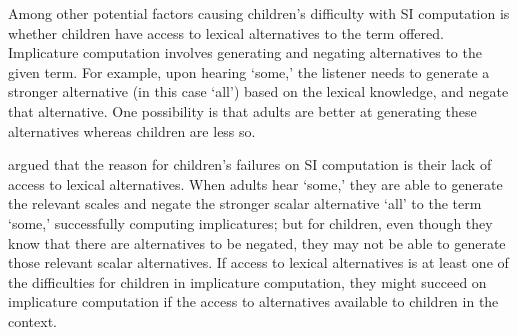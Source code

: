 \documentclass[10pt,letterpaper]{article}
\begin{document}
Among other potential factors causing children's difficulty with SI computation is whether children have access to lexical alternatives to the term offered. Implicature computation involves generating and negating alternatives to the given term. For example, upon hearing `some,' the listener needs to generate a stronger alternative (in this case `all') based on the lexical knowledge, and negate that alternative. One possibility is that adults are better at generating these alternatives whereas children are less so.


 argued that the reason for children's failures on SI computation is their lack of access to lexical alternatives. When adults hear `some,' they are able to generate the relevant scales and negate the stronger scalar alternative `all' to the term `some,' successfully computing implicatures; but for children, even though they know that there are alternatives to be negated, they may not be able to generate those relevant scalar alternatives. If access to lexical alternatives is at least one of the difficulties for children in implicature computation, they might succeed on implicature computation if the access to alternatives available to children in the context. 
\end{document}
